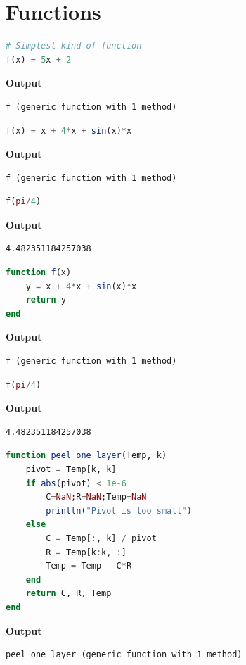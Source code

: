 \section{Functions}
\label{sec:AppendixA:Functions}
\begin{lstlisting}[language=Julia,style=mystyle]
# Simplest kind of function
f(x) = 5x + 2
\end{lstlisting}
\textbf{Output} 
\begin{verbatim}
f (generic function with 1 method)
\end{verbatim}

\begin{lstlisting}[language=Julia,style=mystyle]
f(x) = x + 4*x + sin(x)*x
\end{lstlisting}
\textbf{Output} 
\begin{verbatim}
f (generic function with 1 method)
\end{verbatim}

\begin{lstlisting}[language=Julia,style=mystyle]
f(pi/4)
\end{lstlisting}
\textbf{Output} 
\begin{verbatim}
4.482351184257038
\end{verbatim}

\begin{lstlisting}[language=Julia,style=mystyle]
function f(x)
    y = x + 4*x + sin(x)*x
    return y
end
\end{lstlisting}
\textbf{Output} 
\begin{verbatim}
f (generic function with 1 method)
\end{verbatim}

\begin{lstlisting}[language=Julia,style=mystyle]
f(pi/4)
\end{lstlisting}
\textbf{Output} 
\begin{verbatim}
4.482351184257038
\end{verbatim}

\begin{lstlisting}[language=Julia,style=mystyle]
function peel_one_layer(Temp, k)
    pivot = Temp[k, k]
    if abs(pivot) < 1e-6
        C=NaN;R=NaN;Temp=NaN
        println("Pivot is too small")
    else
        C = Temp[:, k] / pivot
        R = Temp[k:k, :]
        Temp = Temp - C*R
    end
    return C, R, Temp
end
\end{lstlisting}
\textbf{Output} 
\begin{verbatim}
peel_one_layer (generic function with 1 method)
\end{verbatim}

